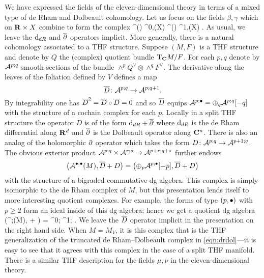 \documentclass[11pt]{amsart}
\begin{document}
We have expressed the fields of the eleven-dimensional theory in terms of a mixed type of de Rham and Dolbeault cohomology.
Let us focus on the fields $\beta,\gamma$ which on $\mathbf{R} \times X$ combine to form the complex
\beqn\label{eqn:drdol}
\Omega^{\bu}(\R) \otimes \Omega^{0,\bu}(X) \xto{1 \otimes \del} \Omega^{\bu}(\R) \otimes \Omega^{1,\bu}(X) .
\eeqn
As usual, we leave the ${\rm d}_{dR}$ and $\overline{\partial}$ operators implicit.
More generally, there is a natural cohomology associated to a THF structure.
Suppose $(M,F)$ is a THF structure and
denote by $Q$ the (complex) quotient bundle ${\rm T}_{\mathbf{C}} M / F$.
For each $p,q$ denote by $\mathcal A^{p;q}$ smooth sections of the bundle $\wedge^p Q^\vee \otimes \wedge^q F^\vee$.
The derivative along the leaves of the foliation defined by $V$ defines a map
\[
\overline{D} \colon \mathcal A^{p;q} \to \mathcal A^{p;q+1}  .
\]
By integrability one has $\overline{D}^2 = \overline{D} \circ \overline{D} = 0$ and so $\overline{D}$ equips $\mathcal A^{p;\bullet} = \oplus_q \mathcal A^{p;q}[-q]$ with the structure of a cochain complex for each $p$.
Locally in a split THF structure the operator $D$ is of the form ${\rm d}_{dR} + \overline{\partial}$ where ${\rm d}_{dR}$ is the de Rham differential along $\mathbf{R}^d$ and $\overline{\partial}$ is the Dolbeault operator along $\mathbf{C}^n$.
There is also an analog of the holomorphic $\partial$ operator which takes the form $D \colon \mathcal A^{p;q} \to \mathcal A^{p+1;q}$.
The obvious exterior product $\mathcal A^{p;q} \times \mathcal A^{r;s} \to \mathcal A^{p+r;q+s}$ further endows
\[
\left(\mathcal A^{\bullet;\bullet} (M), \overline{D} + D\right) = \left(\oplus_p \mathcal A^{p;\bullet}[-p] , \overline{D} + D \right)
\]
with the structure of a bigraded commutative dg algebra.
This complex is simply isomorphic to the de Rham complex of $M$, but this presentation lends itself to more interesting quotient complexes.
For example, the forms of type $(p,\bullet)$ with $p \geq 2$ form an ideal inside of this dg algebra; hence we get a quotient dg algebra
\beqn\label{thfcoh1}
\left(\cA^{;\bu}(M), \thfd + \thfdel\right) = \quad \cA^{0;\bu} \xto{\thfdel} \cA^{1;\bu} .
\eeqn
We leave the $\overline{D}$ operator implicit in the presentation on the right hand side.
When $M = M_V$, it is this complex that is the THF generalization of the truncated de Rham--Dolbeault complex in \eqref{eqn:drdol}---it is easy to see that it agrees with this complex in the case of a split THF manifold.
There is a similar THF description for the fields $\mu,\nu$ in the eleven-dimensional theory.
\end{document}
